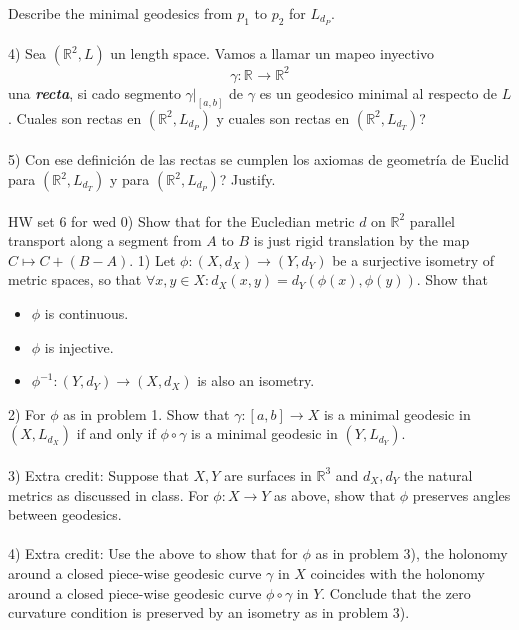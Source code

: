 \documentclass{amsart}
\begin{document}
Describe the minimal geodesics from $p _{1}$  to $p _{2}$ for $L _{d _{P}}$. 
\\\\
4) Sea $(\mathbb{R} ^{2}, L) $ un length space. Vamos
a llamar un mapeo inyectivo $$\gamma: \mathbb{R} ^{} \to
\mathbb{R} ^{2} $$ una \textbf{\emph{recta}}, si cado segmento $\gamma | _{[a,b]}$ de $\gamma$ es un geodesico minimal al respecto de $L$. Cuales son rectas en $(\mathbb{R} ^{2}, L _{d _{P}}) $
y cuales son rectas en $(\mathbb{R} ^{2}, L _{d _{T}}) $?
\\\\
5) Con ese definición de las rectas se cumplen los axiomas de geometría de Euclid para $(\mathbb{R} ^{2}, L _{d _{T}}) $ y para $(\mathbb{R} ^{2}, L _{d _{P}}) $? Justify.
\\\\
HW set 6 for wed
0) Show that for the Eucledian metric $d$ on $\mathbb{R} ^{2} $
parallel transport along a segment from $A$ to $B$ is just
rigid translation by the map $C
\mapsto C + (B-A)$.   
1) Let $\phi: (X, d _{X}) \to (Y, d _{Y})$ be a surjective
isometry of metric spaces, so that $\forall x,y \in X:
d _{X} (x, y) = d _{Y} (\phi (x), \phi (y))$. Show that
\begin{itemize}
\item  $\phi $ is continuous.
\item  $\phi $ is injective.
\item $\phi ^{-1}: (Y, d _{Y}) \to (X, d _{X}) $ is also an
isometry.
\end{itemize}
2) For $\phi $ as in problem 1. Show that $\gamma: [a,b] \to
X$ is
a minimal geodesic in $(X, L _{d _{X}})$ if and only if
$\phi \circ \gamma $ is a minimal geodesic in $(Y, L _{d _{Y}})$.
\\\\
3) Extra credit: Suppose that $X,Y$ are surfaces in $\mathbb{R} ^{3} $ and $d _{X},
d _{Y}$ the natural metrics as discussed in class. For
$\phi: X \to Y $ as above, show that $\phi $ preserves angles between geodesics. 
\\\\
4) Extra credit: Use the above to show that for $\phi $ as
in problem 3), 
the holonomy around a closed piece-wise geodesic curve
$\gamma $ in $X$ coincides with the holonomy around a closed
piece-wise geodesic curve $\phi \circ \gamma $ in $Y$.
Conclude that the zero curvature condition is preserved by
an isometry as in problem 3).
\end{document}

